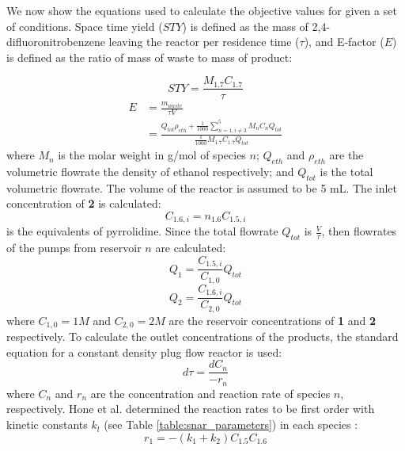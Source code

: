 We now show the equations used to calculate the objective values for given a set of conditions. Space time yield ($STY$) is defined as the mass of 2,4-difluoronitrobenzene leaving the reactor per residence time ($\tau$), and E-factor ($E$) is defined as the ratio of mass of waste to mass of product:

\begin{equation}
    \label{sty}
	STY = \frac{M_{1.7} C_{1.7}}{\tau}
\end{equation}
\begin{equation}
    \label{e_factor}
	\begin{split}
	 E & = \frac{m_{waste}}{\tau V} \\ 
	   & = \frac{Q_{tot}\rho_{eth} + \frac{1}{1000}\sum_{n=1, i \neq 3}^5 M_nC_nQ_{tot}}{\frac{1}{1000}M_{1.7}C_{1.7}Q_{tot}}		
	\end{split}
\end{equation}
where $M_n$ is the molar weight in g/mol of species $n$; $Q_{eth}$ and $\rho_{eth}$ are the volumetric flowrate the density of ethanol respectively; and $Q_{tot}$ is the total volumetric flowrate. The volume of the reactor is assumed to be 5 mL. The inlet concentration of \textbf{2} is calculated:
\begin{equation}
    C_{1.6,i} = n_{1.6} C_{1.5,i}
\end{equation}
is the equivalents of pyrrolidine. Since the total flowrate $Q_{tot}$ is $\frac{V}{\tau}$, then flowrates of the pumps from reservoir $n$ are calculated:
\begin{equation}
    Q_1 = \frac{C_{1.5,i}}{C_{1,0}}Q_{tot}
\end{equation}
\begin{equation}
    Q_2 = \frac{C_{1.6,i}}{C_{2,0}}Q_{tot}
\end{equation}
where $C_{1,0}=1 M$ and $C_{2,0}=2 M$ are the reservoir concentrations of \textbf{1} and \textbf{2} respectively. To calculate the outlet concentrations of the products, the standard equation for a constant density plug flow reactor is used:
\begin{equation}
	\label{pfr}
	d\tau = \frac{dC_n}{- r_n}
\end{equation}
where $C_n$ and $r_n$ are the concentration and reaction rate of species $n$, respectively. Hone et al. determined the reaction rates to be first order with kinetic constants $k_l$ (see Table \ref{table:snar_parameters}) in each species \cite{Hone2017}:
\begin{equation}
    \label{equation:r_1}
	r_{1} = -(k_1+k_2)C_{1.5}C_{1.6}	
\end{equation}
